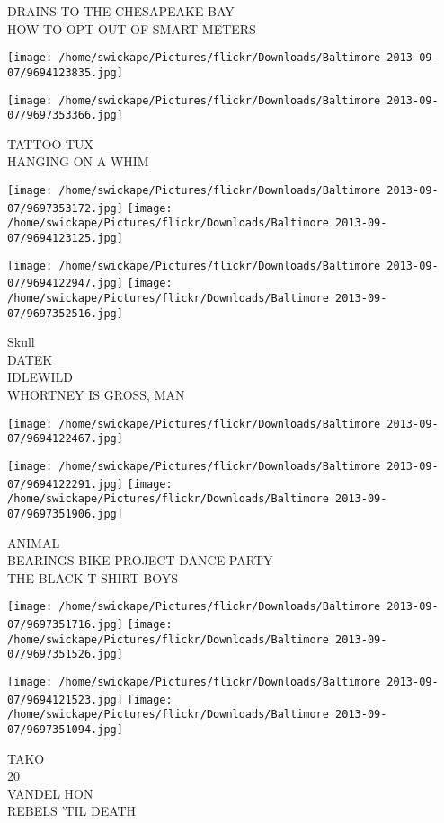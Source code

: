 \documentclass[10pt,letterpaper]{article}
\begin{document}
DRAINS TO THE CHESAPEAKE BAY\\
HOW TO OPT OUT OF SMART METERS
\pagebreak

\texttt{[image: /home/swickape/Pictures/flickr/Downloads/Baltimore 2013-09-07/9694123835.jpg]}

\vspace{0.25in}
\texttt{[image: /home/swickape/Pictures/flickr/Downloads/Baltimore 2013-09-07/9697353366.jpg]}

TATTOO TUX\\
HANGING ON A WHIM
\pagebreak

\texttt{[image: /home/swickape/Pictures/flickr/Downloads/Baltimore 2013-09-07/9697353172.jpg]}
\texttt{[image: /home/swickape/Pictures/flickr/Downloads/Baltimore 2013-09-07/9694123125.jpg]}

\texttt{[image: /home/swickape/Pictures/flickr/Downloads/Baltimore 2013-09-07/9694122947.jpg]}
\texttt{[image: /home/swickape/Pictures/flickr/Downloads/Baltimore 2013-09-07/9697352516.jpg]}

Skull\\
DATEK\\
IDLEWILD\\
WHORTNEY IS GROSS, MAN
\pagebreak

\texttt{[image: /home/swickape/Pictures/flickr/Downloads/Baltimore 2013-09-07/9694122467.jpg]}

\vspace{0.25in}
\texttt{[image: /home/swickape/Pictures/flickr/Downloads/Baltimore 2013-09-07/9694122291.jpg]}
\texttt{[image: /home/swickape/Pictures/flickr/Downloads/Baltimore 2013-09-07/9697351906.jpg]}

ANIMAL\\
BEARINGS BIKE PROJECT DANCE PARTY\\
THE BLACK T{-}SHIRT BOYS
\pagebreak

\texttt{[image: /home/swickape/Pictures/flickr/Downloads/Baltimore 2013-09-07/9697351716.jpg]}
\texttt{[image: /home/swickape/Pictures/flickr/Downloads/Baltimore 2013-09-07/9697351526.jpg]}

\texttt{[image: /home/swickape/Pictures/flickr/Downloads/Baltimore 2013-09-07/9694121523.jpg]}
\texttt{[image: /home/swickape/Pictures/flickr/Downloads/Baltimore 2013-09-07/9697351094.jpg]}

TAKO\\
20\\
VANDEL HON\\
REBELS 'TIL DEATH
\pagebreak
\end{document}
